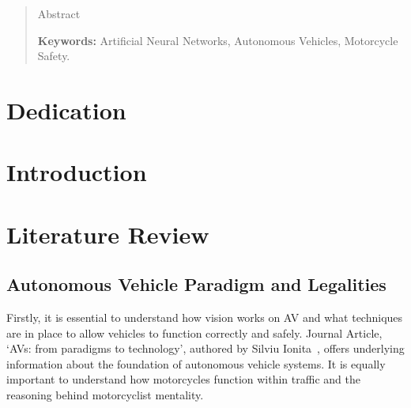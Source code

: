 \documentclass[12pt]{report} %
\begin{document}
\renewcommand\abstractname{\large\bfseries\filcenter\uppercase{Summary}}
\begin{abstract}
	\thispagestyle{plain}
	\setcounter{page}{3}

	Abstract

	\textbf{Keywords:} %
	Artificial Neural Networks, Autonomous Vehicles, Motorcycle Safety.
	\vfill
\end{abstract}
\newpage %
\thispagestyle{empty}
\mbox{}
\chapter*{Dedication}

\setcounter{page}{5}

\vfill

\newpage %
\thispagestyle{empty}
\mbox{}



\tableofcontents
\thispagestyle{fancy}

\newpage %
\thispagestyle{empty}
\mbox{}

\listoffigures
\thispagestyle{fancy}

\newpage %
\thispagestyle{empty}
\mbox{}

\listoftables
\thispagestyle{fancy}

\newpage %
\thispagestyle{empty}
\mbox{}


\clearpage
{} %

\chapter{Introduction}

\chapter{Literature Review}
\label{sec:literatureReview}
	\section{Autonomous Vehicle Paradigm and Legalities}
		Firstly, it is essential to understand how vision works on AV and what techniques are in place to allow vehicles to function correctly and safely. Journal Article, `AVs: from paradigms to technology', authored by Silviu Ionita~\cite{ionita_autonomous_2017}, offers underlying information about the foundation of autonomous vehicle systems. It is equally important to understand how motorcycles function within traffic and the reasoning behind motorcyclist mentality.
\end{document}
